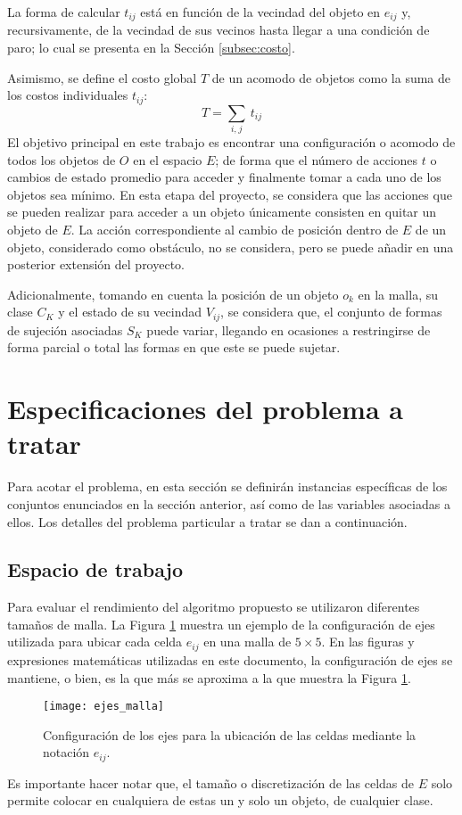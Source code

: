 La forma de calcular $t_{ij}$ está en función de la vecindad del objeto en $e_{ij}$ y, recursivamente, de la vecindad de sus vecinos hasta llegar a una condición de paro; lo cual se presenta en la Sección \ref{subsec:costo}.

Asimismo, se define el costo global $T$ de un acomodo de objetos como la suma de los costos individuales $t_{ij}$:
%
\begin{equation}
\label{eq:costo_global}
	T = \sum_{i,\hspace{1pt} j}\ t_{ij}
\end{equation}
%
El objetivo principal en este trabajo es encontrar una configuración o acomodo de todos los objetos de $O$ en el espacio $E$; de forma que el número de acciones $t$ o cambios de estado promedio para acceder y finalmente tomar a cada uno de los objetos sea mínimo.
En esta etapa del proyecto, se considera que las acciones que se pueden realizar para acceder a un objeto únicamente consisten en quitar un objeto de $E$.
La acción correspondiente al cambio de posición dentro de $E$ de un objeto, considerado como obstáculo, no se considera, pero se puede añadir en una posterior extensión del proyecto.

Adicionalmente, tomando en cuenta la posición de un objeto $o_k$ en la malla, su clase $C_K$ y el estado de su vecindad $V_{ij}$, se considera que, el conjunto de formas de sujeción asociadas $S_K$ puede variar, llegando en ocasiones a restringirse de forma parcial o total las formas en que este se puede sujetar.
%
%
\section{Especificaciones del problema a tratar}
\label{sec:especificaciones}
%
%
Para acotar el problema, en esta sección se definirán instancias específicas de los conjuntos enunciados en la sección anterior, así como de las variables asociadas a ellos.
Los detalles del problema particular a tratar se dan a continuación.
%
%
\subsection{Espacio de trabajo}
\label{subsec:espacio_trabajo}
%
%
Para evaluar el rendimiento del algoritmo propuesto se utilizaron diferentes tamaños de malla.
La Figura \ref{fig:ejes_malla} muestra un ejemplo de la configuración de ejes utilizada para ubicar cada celda $e_{ij}$ en una malla de $5\times 5$.
En las figuras y expresiones matemáticas utilizadas en este documento, la configuración de ejes se mantiene, o bien, es la que más se aproxima a la que muestra la Figura \ref{fig:ejes_malla}.
%
\begin{figure}[H]
	\texttt{[image: ejes\_malla]}%
	\caption{Configuración de los ejes para la ubicación de las celdas mediante la notación $e_{ij}$.}%
	\label{fig:ejes_malla}%
\end{figure}
%
Es importante hacer notar que, el tamaño o discretización de las celdas de $E$ solo permite colocar en cualquiera de estas un y solo un objeto, de cualquier clase.
%
%
